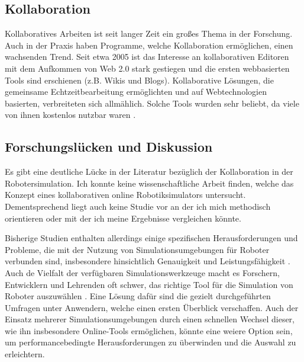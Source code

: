 \documentclass[german,version-2020-11]{uzl-thesis}
\begin{document}
  
\subsection{Kollaboration}
Kollaboratives Arbeiten ist seit langer Zeit ein großes Thema in der Forschung. 
Auch in der Praxis haben Programme, welche Kollaboration ermöglichen, einen wachsenden Trend.
Seit etwa 2005 ist das Interesse an kollaborativen Editoren mit dem Aufkommen von Web 2.0 stark gestiegen 
und die ersten webbasierten Tools sind erschienen (z.B. Wikis und Blogs). 
Kollaborative Lösungen, die gemeinsame Echtzeitbearbeitung ermöglichten und auf Webtechnologien basierten, verbreiteten sich allmählich. 
Solche Tools wurden sehr beliebt, da viele von ihnen kostenlos nutzbar waren \cite{Kainberger2022}.
    

    
\subsection{Forschungslücken und Diskussion}




    Es gibt eine deutliche Lücke in der Literatur bezüglich der Kollaboration in der Robotersimulation. 
    Ich konnte keine wissenschaftliche Arbeit finden, welche das Konzept eines kollaborativen online Robotiksimulators untersucht.
    Dementsprechend liegt auch keine Studie vor an der ich mich methodisch orientieren oder mit der ich meine Ergebnisse vergleichen könnte.

    Bisherige Studien enthalten allerdings einige spezifischen Herausforderungen und Probleme, die mit der Nutzung von Simulationsumgebungen für Roboter verbunden sind, insbesondere hinsichtlich Genauigkeit und Leistungsfähigkeit \cite{Ivaldi2015}. 
    Auch de Vielfalt der verfügbaren Simulationswerkzeuge macht es Forschern, Entwicklern und Lehrenden oft schwer, das richtige Tool für die Simulation von Roboter auszuwählen \cite{Castillo2010}. 
    Eine Lösung dafür sind die gezielt durchgeführten Umfragen unter Anwendern, welche einen ersten Überblick verschaffen. 
    Auch der Einsatz mehrerer Simulationsumgebungen durch einen schnellen Wechsel dieser, wie ihn insbesondere Online-Tools ermöglichen, 
    könnte eine weiere Option sein, um performancebedingte Herausforderungen zu überwinden und die Auswahl zu erleichtern.
\end{document}
